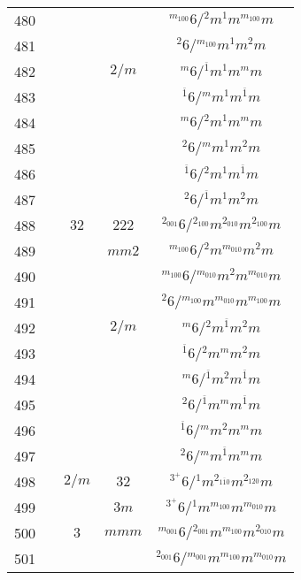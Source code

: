 \begin{longtable}{ccccc}
  480 &  &  &  & ${}^{m_{100}} 6  / {}^{2} m {}^{1} m {}^{m_{100}} m $\\
  481 &  &  &  & ${}^{2} 6  / {}^{m_{100}} m {}^{1} m {}^{2} m $\\
  482 &  &  & $2/m$ & ${}^{m} 6  / {}^{\overline{1}} m {}^{1} m {}^{m} m $\\
  483 &  &  &  & ${}^{\overline{1}} 6  / {}^{m} m {}^{1} m {}^{\overline{1}} m $\\
  484 &  &  &  & ${}^{m} 6  / {}^{2} m {}^{1} m {}^{m} m $\\
  485 &  &  &  & ${}^{2} 6  / {}^{m} m {}^{1} m {}^{2} m $\\
  486 &  &  &  & ${}^{\overline{1}} 6  / {}^{2} m {}^{1} m {}^{\overline{1}} m $\\
  487 &  &  &  & ${}^{2} 6  / {}^{\overline{1}} m {}^{1} m {}^{2} m $\\
  488 &  & $32$ & $222$ & ${}^{2_{001}} 6  / {}^{2_{100}} m {}^{2_{010}} m {}^{2_{100}} m $\\
  489 &  &  & $mm2$ & ${}^{m_{100}} 6  / {}^{2} m {}^{m_{010}} m {}^{2} m $\\
  490 &  &  &  & ${}^{m_{100}} 6  / {}^{m_{010}} m {}^{2} m {}^{m_{010}} m $\\
  491 &  &  &  & ${}^{2} 6  / {}^{m_{100}} m {}^{m_{010}} m {}^{m_{100}} m $\\
  492 &  &  & $2/m$ & ${}^{m} 6  / {}^{2} m {}^{\overline{1}} m {}^{2} m $\\
  493 &  &  &  & ${}^{\overline{1}} 6  / {}^{2} m {}^{m} m {}^{2} m $\\
  494 &  &  &  & ${}^{m} 6  / {}^{\overline{1}} m {}^{2} m {}^{\overline{1}} m $\\
  495 &  &  &  & ${}^{2} 6  / {}^{\overline{1}} m {}^{m} m {}^{\overline{1}} m $\\
  496 &  &  &  & ${}^{\overline{1}} 6  / {}^{m} m {}^{2} m {}^{m} m $\\
  497 &  &  &  & ${}^{2} 6  / {}^{m} m {}^{\overline{1}} m {}^{m} m $\\
  498 &  & $2/m$ & $32$ & ${}^{3^{+}} 6  / {}^{1} m {}^{2_{1\overline{1}0}} m {}^{2_{120}} m $\\
  499 &  &  & $3m$ & ${}^{3^{+}} 6  / {}^{1} m {}^{m_{100}} m {}^{m_{010}} m $\\
  500 &  & $3$ & $mmm$ & ${}^{m_{001}} 6  / {}^{2_{001}} m {}^{m_{100}} m {}^{2_{010}} m $\\
  501 &  &  &  & ${}^{2_{001}} 6  / {}^{m_{001}} m {}^{m_{100}} m {}^{m_{010}} m $\\

\end{longtable}
